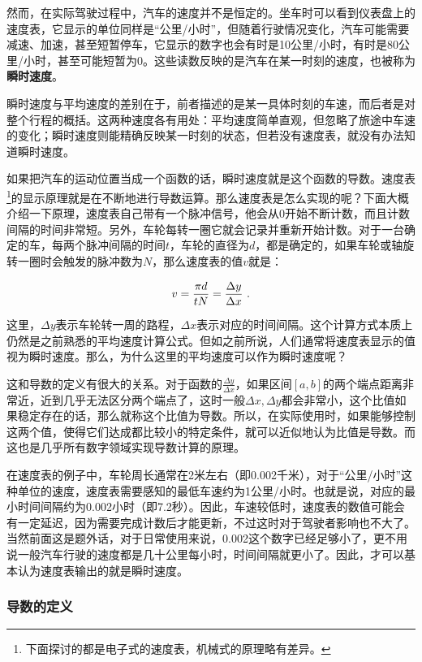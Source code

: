 然而，在实际驾驶过程中，汽车的速度并不是恒定的。坐车时可以看到仪表盘上的速度表，它显示的单位同样是“公里/小时”，但随着行驶情况变化，汽车可能需要减速、加速，甚至短暂停车，它显示的数字也会有时是10公里/小时，有时是80公里/小时，甚至可能短暂为0。这些读数反映的是汽车在某一时刻的速度，也被称为\textbf{瞬时速度}。

瞬时速度与平均速度的差别在于，前者描述的是某一具体时刻的车速，而后者是对整个行程的概括。这两种速度各有用处：平均速度简单直观，但忽略了旅途中车速的变化；瞬时速度则能精确反映某一时刻的状态，但若没有速度表，就没有办法知道瞬时速度。

如果把汽车的运动位置当成一个函数的话，瞬时速度就是这个函数的导数。速度表\footnote{下面探讨的都是电子式的速度表，机械式的原理略有差异。}的显示原理就是在不断地进行导数运算。那么速度表是怎么实现的呢？下面大概介绍一下原理，速度表自己带有一个脉冲信号，他会从0开始不断计数，而且计数间隔的时间非常短。另外，车轮每转一圈它就会记录并重新开始计数。对于一台确定的车，每两个脉冲间隔的时间$t$，车轮的直径为$d$，都是确定的，如果车轮或轴旋转一圈时会触发的脉冲数为$N$，那么速度表的值$v$就是：

\begin{equation}
v={\pi d\over tN}=\frac{\Delta y}{\Delta x}~.
\end{equation}

这里，$\Delta y$表示车轮转一周的路程，$\Delta x$表示对应的时间间隔。这个计算方式本质上仍然是之前熟悉的平均速度计算公式。但如之前所说，人们通常将速度表显示的值视为瞬时速度。那么，为什么这里的平均速度可以作为瞬时速度呢？

这和导数的定义有很大的关系。对于函数的$\displaystyle\frac{\Delta y}{\Delta x}$，如果区间$[a, b]$的两个端点距离非常近，近到几乎无法区分两个端点了，这时一般$\Delta x,\Delta y$都会非常小，这个比值如果稳定存在的话，那么就称这个比值为导数。所以，在实际使用时，如果能够控制这两个值，使得它们达成都比较小的特定条件，就可以近似地认为比值是导数。而这也是几乎所有数字领域实现导数计算的原理。

在速度表的例子中，车轮周长通常在2米左右（即0.002千米），对于“公里/小时”这种单位的速度，速度表需要感知的最低车速约为1公里/小时。也就是说，对应的最小时间间隔约为0.002小时（即7.2秒）。因此，车速较低时，速度表的数值可能会有一定延迟，因为需要完成计数后才能更新，不过这时对于驾驶者影响也不大了。当然前面这是题外话，对于日常使用来说，0.002这个数字已经足够小了，更不用说一般汽车行驶的速度都是几十公里每小时，时间间隔就更小了。因此，才可以基本认为速度表输出的就是瞬时速度。

\subsubsection{导数的定义}

